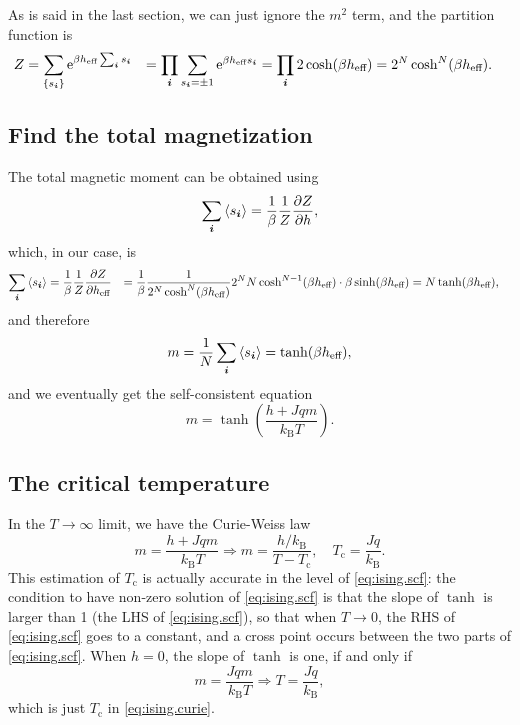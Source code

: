 \documentclass[hyperref, a4paper]{article}
\newcommand*{\ee}{\mathrm{e}}
\def\\{}%
\newcommand*{\Tc}{T_{\text{c}}}
\newcommand*{\kB}{k_{\text{B}}}
\begin{document}
As is said in the last section, 
we can just ignore the $m^2$ term, 
and the partition function is 
\begin{equation}
    \begin{aligned}
        Z &= \sum_{\{s_{\vb*{i}}\}} \ee^{ \beta h_{\text{eff}} \sum_{\vb*{i}} s_{\vb*{i}}} \\
        &= \prod_{\vb*{i}} \sum_{s_{\vb*{i}} = \pm 1} 
        \ee^{\beta h_{\text{eff}} s_{\vb*{i}}} = \prod_{\vb*{i}} 2 \cosh (\beta h_{\text{eff}}) \\
        &= 2^N \cosh^N (\beta h_{\text{eff}}). 
    \end{aligned} 
\end{equation}

\subsection{Find the total magnetization}

The total magnetic moment can be obtained using 
\begin{equation}
    \sum_{\vb*{i}} \expval{s_{\vb*{i}}} = \frac{1}{\beta} \frac{1}{Z} \pdv{Z}{h} , 
\end{equation}
which, in our case, is 
\[
    \begin{aligned}
        \sum_{\vb*{i}} \expval{s_{\vb*{i}}} &= \frac{1}{\beta} \frac{1}{Z} \pdv{Z}{h_{\text{eff}}} \\
        &= \frac{1}{\beta} \frac{1}{2^N \cosh^N (\beta h_{\text{eff}})} 
        2^N N \cosh^{N-1} (\beta h_{\text{eff}}) \cdot \beta \sinh(\beta h_{\text{eff}}) \\
        &= N \tanh (\beta h_{\text{eff}}), 
    \end{aligned}
\]
and therefore 
\[
    m = \frac{1}{N} \sum_{\vb*{i}} \expval{s_{\vb*{i}}}
    = \tanh(\beta h_{\text{eff}}),
\]
and we eventually get the self-consistent equation 
\begin{equation}
    m = \tanh(\frac{h + Jq m}{\kB T}).
    \label{eq:ising.scf}
\end{equation}

\subsection{The critical temperature}

In the $T \to \infty$ limit, we have the Curie-Weiss law 
\begin{equation}
    m = \frac{h + Jqm}{\kB T} \Rightarrow 
    m = \frac{h / \kB}{T - \Tc}, \quad 
    \Tc = \frac{Jq}{\kB}.
    \label{eq:ising.curie}
\end{equation}
This estimation of $\Tc$ is actually accurate in the level of \eqref{eq:ising.scf}: 
the condition to have non-zero solution of \eqref{eq:ising.scf} 
is that the slope of $\tanh$ is larger than 1 (the LHS of \eqref{eq:ising.scf}), 
so that when $T \to 0$, 
the RHS of \eqref{eq:ising.scf} goes to a constant, 
and a cross point occurs between the two parts of \eqref{eq:ising.scf}.
When $h = 0$, the slope of $\tanh$ is one, if and only if 
\[
    m = \frac{J q m}{\kB T} \Rightarrow T = \frac{J q}{\kB},
\]
which is just $\Tc$ in \eqref{eq:ising.curie}.
\end{document}
